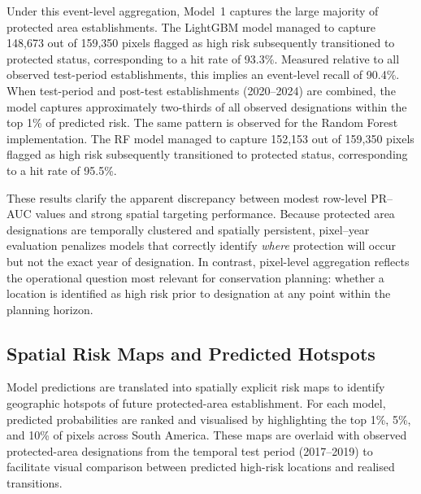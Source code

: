\documentclass[12pt]{article}
\theoremstyle{break} %
\begin{document}
Under this event-level aggregation, Model~1 captures the large majority of protected area establishments. The LightGBM model managed to capture 148{,}673 out of 159{,}350 pixels flagged as high risk subsequently transitioned to protected status, corresponding to a hit rate of 93.3\%. Measured relative to all observed test-period establishments, this implies an event-level recall of 90.4\%. When test-period and post-test establishments (2020--2024) are combined, the model captures approximately two-thirds of all observed designations within the top 1\% of predicted risk. The same pattern is observed for the Random Forest implementation. The RF model managed to capture 152{,}153 out of 159{,}350 pixels flagged as high risk subsequently transitioned to protected status, corresponding to a hit rate of 95.5\%. 


These results clarify the apparent discrepancy between modest row-level PR--AUC values and strong spatial targeting performance. Because protected area designations are temporally clustered and spatially persistent, pixel--year evaluation penalizes models that correctly identify \emph{where} protection will occur but not the exact year of designation. In contrast, pixel-level aggregation reflects the operational question most relevant for conservation planning: whether a location is identified as high risk prior to designation at any point within the planning horizon.



\subsection{Spatial Risk Maps and Predicted Hotspots}
\label{results:spatial_outputs}

Model predictions are translated into spatially explicit risk maps to identify geographic hotspots of future protected-area establishment. For each model, predicted probabilities are ranked and visualised by highlighting the top 1\%, 5\%, and 10\% of pixels across South America. These maps are overlaid with observed protected-area designations from the temporal test period (2017--2019) to facilitate visual comparison between predicted high-risk locations and realised transitions.
\end{document}
